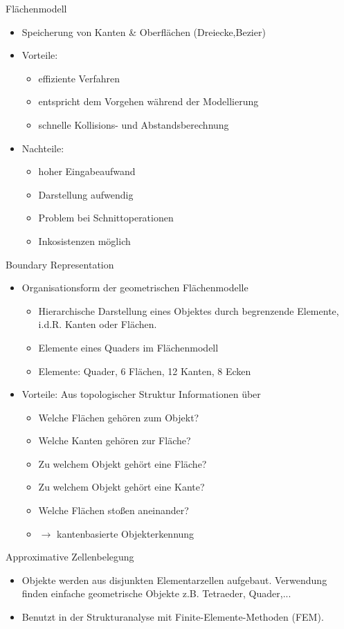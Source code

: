 \documentclass[paper=a4, fontsize=11pt]{scrartcl} %
\numberwithin{equation}{section} %
\numberwithin{figure}{section} %
\numberwithin{table}{section} %
\begin{document}
Flächenmodell
\begin{itemize}
\item Speicherung von Kanten \& Oberflächen (Dreiecke,Bezier)
\item Vorteile:
\begin{itemize}
\item effiziente Verfahren
\item entspricht dem Vorgehen während der Modellierung
\item schnelle Kollisions- und Abstandsberechnung
\end{itemize}
\item Nachteile:
\begin{itemize}
\item hoher Eingabeaufwand
\item Darstellung aufwendig
\item Problem bei Schnittoperationen
\item Inkosistenzen möglich
\end{itemize}
\end{itemize}

Boundary Representation
\begin{itemize}
\item Organisationsform der geometrischen Flächenmodelle
\begin{itemize}
\item Hierarchische Darstellung eines Objektes durch begrenzende Elemente, i.d.R. Kanten oder Flächen.
\item Elemente eines Quaders im Flächenmodell
\item Elemente: Quader, 6 Flächen, 12 Kanten, 8 Ecken
\end{itemize}
\item Vorteile: Aus topologischer Struktur Informationen über
\begin{itemize}
\item Welche Flächen gehören zum Objekt?
\item Welche Kanten gehören zur Fläche?
\item Zu welchem Objekt gehört eine Fläche?
\item Zu welchem Objekt gehört eine Kante?
\item Welche Flächen stoßen aneinander?
\item $\rightarrow$ kantenbasierte Objekterkennung
\end{itemize}
\end{itemize}

Approximative Zellenbelegung
\begin{itemize}
\item Objekte werden aus disjunkten Elementarzellen aufgebaut. Verwendung finden einfache geometrische Objekte z.B. Tetraeder, Quader,...
\item Benutzt in der Strukturanalyse mit Finite-Elemente-Methoden (FEM).
\end{itemize}
\end{document}
